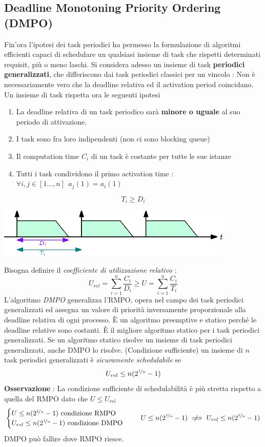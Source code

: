\documentclass[10pt, letterpaper]{report}
\begin{document}
\subsection{Deadline Monotoning Priority Ordering (DMPO)}
Fin'ora l'ipotesi dei task periodici ha permesso la formulazione di algoritmi efficienti capaci 
di schedulare un qualsiasi insieme di task che rispetti determinati requisit, più o meno laschi. \acc 
Si considera adesso un insieme di task \textbf{periodici generalizzati}, che differiscono dai task periodici 
classici per un vincolo : Non è necessariamente vero che la deadline relativa ed il activation period coincidano.
Un insieme di task rispetta ora le seguenti ipotesi
\begin{enumerate}
    \item La deadline relativa di un task periodico sarà \textbf{minore o uguale} al suo periodo di attivazione.
    \item I task sono fra loro indipendenti (non ci sono blocking queue)
    \item Il computation time $C_i$ di un task è costante per tutte le sue istanze 
    \item Tutti i task condividono il primo activation time : $\forall i,j\in[1\dots, n] \ \ a_j(1)=a_i(1)$
\end{enumerate}
$$ T_i\ge D_i$$\begin{center}
    \includegraphics[width=0.85\textwidth ]{images/periodicoGeneralizzato.eps}
\end{center}
Bisogna definire il \textit{coefficiente di utilizzazione relativo} :
$$ U_{rel}=\sum_{i=1}^{n}\frac{C_i}{D_i}\ge  U=\sum_{i=1}^{n}\frac{C_i}{T_i}$$
L'algoritmo \textit{DMPO} generalizza l'RMPO, opera nel campo dei task periodici generalizzati 
ed assegna un valore di priorità inversamente proporzionale 
alla deadline relativa di ogni processo. È un algoritmo preemptive e statico perché le deadline relative sono 
costanti.\acc 
{} È il migliore algoritmo statico per i task periodici generalizzati. \acc 
{} Se un algoritmo statico risolve un insieme di task periodici generalizzati, anche DMPO lo risolve.\acc 
{} (Condizione sufficiente) un insieme di $n$ task periodici generalizzati è \textit{sicuramente schedulabile} se 
$$ U_{rel}\le n(2^{\nicefrac{1}{n}}-1)$$
\textbf{Osservazione} : La condizione sufficiente di schedulabilità è più stretta rispetto 
a quella del RMPO dato che $U\le U_{rel}$ $$\begin{cases}
    U\le n(2^{\nicefrac{1}{n}}-1) \text{ condizione RMPO }\\ 
    U_{rel}\le n(2^{\nicefrac{1}{n}}-1) \text{ condizione DMPO }
\end{cases}  \ \ \ U\le n(2^{\nicefrac{1}{n}}-1) \notimplies U_{rel} \le n(2^{\nicefrac{1}{n}}-1)$$
DMPO può fallire dove RMPO riesce.
\end{document}
